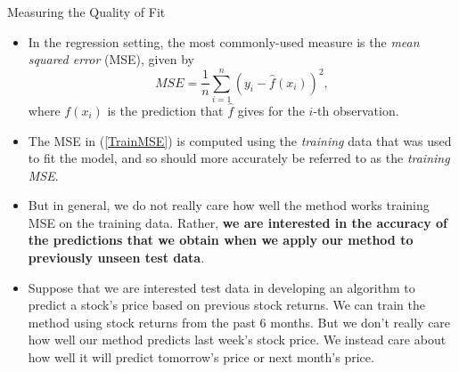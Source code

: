 \documentclass[10pt,a4paper]{beamer}
\begin{document}
\begin{frame}{Measuring the Quality of Fit}

\begin{itemize}\small
  \item In the regression setting, the
most commonly-used measure is the \emph{mean squared error} (MSE), given by
\begin{equation}\label{TrainMSE}
  MSE = \frac{1}{n}\sum^n_{i=1} (y_i-\hat{f}(x_i))^2,
\end{equation}
where $f(x_i)$ is the prediction that $\hat{f}$ gives for the $i$-th observation.
  \item The MSE in (\ref{TrainMSE}) is computed using the \emph{training} data that was used to
fit the model, and so should more accurately be referred to as the \emph{training MSE}.
  \item But in general, we do not really care how well the method works training
MSE on the training data. Rather, \textbf{we are interested in the accuracy of the predictions that we obtain when we apply our method to previously unseen
test data}.
\item Suppose that we are interested test data
in developing an algorithm to predict a stock's price based on previous
stock returns. We can train the method using stock returns from the past
6 months. But we don't really care how well our method predicts last week's
stock price. We instead care about how well it will predict tomorrow's price
or next month's price.
\end{itemize}


\end{frame}
\end{document}

